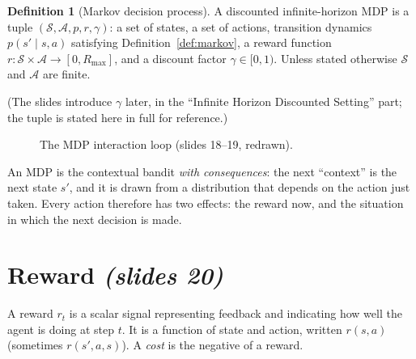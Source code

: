 \documentclass[11pt,a4paper]{article}
\newcommand{\cS}{\mathcal{S}}
\newcommand{\cA}{\mathcal{A}}
\newcommand{\Rmax}{R_{\max}}
\newcommand{\slr}[1]{\texorpdfstring{\emph{(slides #1)}}{(slides #1)}}
\theoremstyle{plain}
\theoremstyle{definition}
\newtheorem{definition}[theorem]{Definition}
\theoremstyle{remark}
\begin{document}
\begin{definition}[Markov decision process]\label{def:mdp}
A discounted infinite-horizon MDP is a tuple $(\cS,\cA,p,r,\gamma)$: a set of states, a set of actions, transition dynamics $p(s'\mid s,a)$ satisfying Definition~\ref{def:markov}, a reward function $r:\cS\times\cA\to[0,\Rmax]$, and a discount factor $\gamma\in[0,1)$. Unless stated otherwise $\cS$ and $\cA$ are finite.
\end{definition}
(The slides introduce $\gamma$ later, in the ``Infinite Horizon Discounted Setting'' part; the tuple is stated here in full for reference.)

\begin{figure}[htbp]
\centering
{}
\caption{The MDP interaction loop (slides 18--19, redrawn).}
\end{figure}

\begin{intuition}
An MDP is the contextual bandit \emph{with consequences}: the next ``context'' is the next state $s'$, and it is drawn from a distribution that depends on the action just taken. Every action therefore has two effects: the reward now, and the situation in which the next decision is made.
\end{intuition}

\section{Reward \slr{20}}
A reward $r_t$ is a scalar signal representing feedback and indicating how well the agent is doing at step $t$. It is a function of state and action, written $r(s,a)$ (sometimes $r(s',a,s)$). A \emph{cost} is the negative of a reward.
\end{document}
